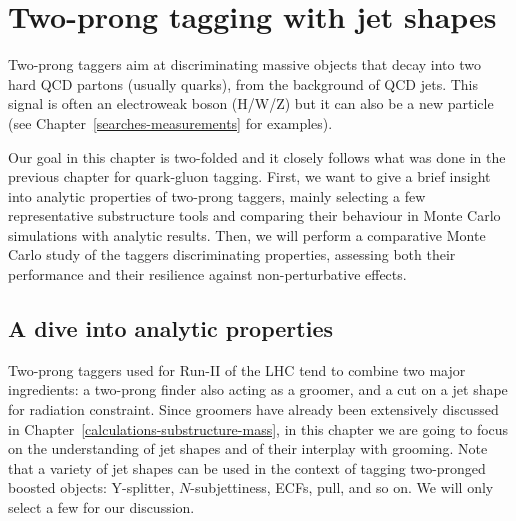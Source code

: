 \chapter{Two-prong tagging with jet shapes}\label{chap:calc-two-prongs}

 Two-prong taggers aim at
discriminating massive objects that decay into two hard QCD partons
(usually quarks), from the background of QCD jets. This signal is
often an electroweak boson (H/W/Z) but it can also be a new
particle (see Chapter~\ref{searches-measurements} for examples).

Our goal in this chapter is two-folded and it closely follows what was
done in the previous chapter for quark-gluon tagging. First, we want to
give a brief insight into analytic properties of two-prong taggers,
mainly selecting a few representative substructure tools and comparing their
behaviour in Monte Carlo simulations with analytic results. Then, we
will perform a comparative Monte Carlo study of the taggers
discriminating properties, assessing both their performance and their
resilience against non-perturbative effects. 

\section{A dive into analytic properties}\label{sec:two-prongs-analytic}

Two-prong taggers used for Run-II of the LHC tend to combine two major
ingredients: a two-prong finder also acting as a groomer, and a cut on
a jet shape for radiation constraint. 
%
Since groomers have already been extensively discussed in
Chapter~\ref{calculations-substructure-mass}, in this chapter we are going to focus on
the understanding of jet shapes and of their
interplay with grooming.
%
Note that a variety of jet shapes can be used in the context of tagging
two-pronged boosted objects: Y-splitter, $N$-subjettiness, ECFs,
pull, and so on.  We will only select a few for our discussion.
 
